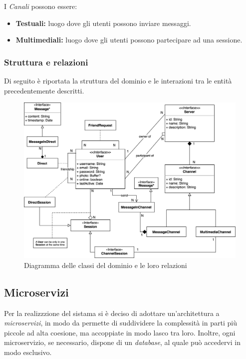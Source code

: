 I \emph{Canali} possono essere:
\begin{itemize}
    \item \textbf{Testuali:} luogo dove gli utenti possono inviare messaggi.

    \item \textbf{Multimediali:} luogo dove gli utenti possono partecipare ad una sessione.
\end{itemize}

%
%
%
\subsubsection{Struttura e relazioni}

Di seguito è riportata la struttura del dominio e le interazioni tra le entità precedentemente descritti.

\begin{figure}[H]
    \centering
    \includegraphics[width=\textwidth]{sections/03-design/img/piperchat-Dominio.jpg}
    \caption{Diagramma delle classi del dominio e le loro relazioni}
    \label{fig:domain}
\end{figure}

%
%
%
\subsection{Microservizi}

Per la realizzzione del sistama si è deciso di adottare un'architettura a \emph{microservizi}, in modo da permette di suddividere la complessità in parti più piccole ad alta coesione, ma accoppiate in modo lasco tra loro.
%
Inoltre, ogni microservizio, se necessario, dispone di un \emph{database}, al quale può accedervi in modo esclusivo.

